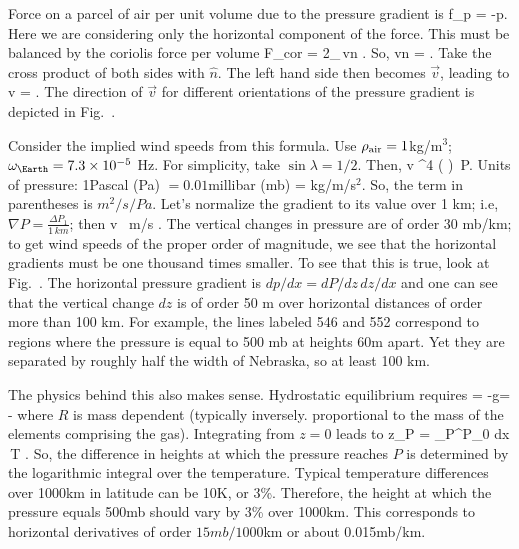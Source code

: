 \documentclass[11pt]{book}
\begin{document}
Force on a parcel of air per unit volume due to the pressure gradient is
\be
\vec f_p = -\nabla p.\ee
Here we are considering only the horizontal component of the force. This must be balanced by the coriolis force per volume
\be
\vec F_{cor} = 2\rho\omega_\Earth\sin\lambda\,\vec v\times \hat n
.\ee
So,
\be\vec v\times\hat n = 
.\ee
Take the cross product of both sides with $\hat n$. The left hand side then becomes $\vec v$, leading to
\be
\vec v = .\ee
The direction of $\vec v$ for different orientations of the pressure gradient is depicted in Fig.~.

Consider the implied wind speeds from this formula. Use $\rho_{\rm air}=1$kg/m$^3$; $\omega_\Earth= 7.3\times 10^{-5}$ Hz. For simplicity, take $\sin\lambda=1/2$. Then,
\be
v ^4 \left( \right)\, \nabla P.\ee
Units of pressure: 1Pascal (Pa) $=0.01$millibar (mb) = kg/m/s$^2$. So, the term in parentheses is
$m^2/s/Pa$. Let's normalize the gradient to its value over 1 km; i.e, $\nabla P =\frac{\Delta P_1}{1\,km}$; then
\be
v \, m/s 
.\ee
The vertical changes in pressure are of order 30 mb/km; to get wind speeds of the proper order of magnitude, we see that the horizontal gradients must be one thousand times smaller. 
To see that this is true, look at Fig.~.
The horizontal pressure gradient is $dp/dx = dP/dz\, dz/dx$ and one can see that the vertical change $dz$ is of order 50 m over horizontal distances of order more than 100 km. For example, the lines labeled 546 and 552 correspond to regions where the pressure is equal to 500 mb at heights 60m apart. Yet they are separated by roughly half the width of Nebraska, so at least 100 km.

The physics behind this also makes sense. Hydrostatic equilibrium requires
\be
{} = -g\rho = -
\ee
where $R$ is mass dependent (typically inversely. proportional to the mass of the elements comprising the gas). Integrating from $z=0$ leads to
\be
z_P =  \int_{\ln P}^{\ln P_0} dx \,T
.\ee
So, the difference in heights at which the pressure reaches $P$ is determined by the logarithmic integral over the temperature. Typical temperature differences over 1000km in latitude can be 10K, or 3\%. Therefore, the height at which the pressure equals 500mb should vary by 3\% over 1000km. This corresponds to horizontal derivatives of order $15mb/1000$km or about 0.015mb/km. 
\end{document}
